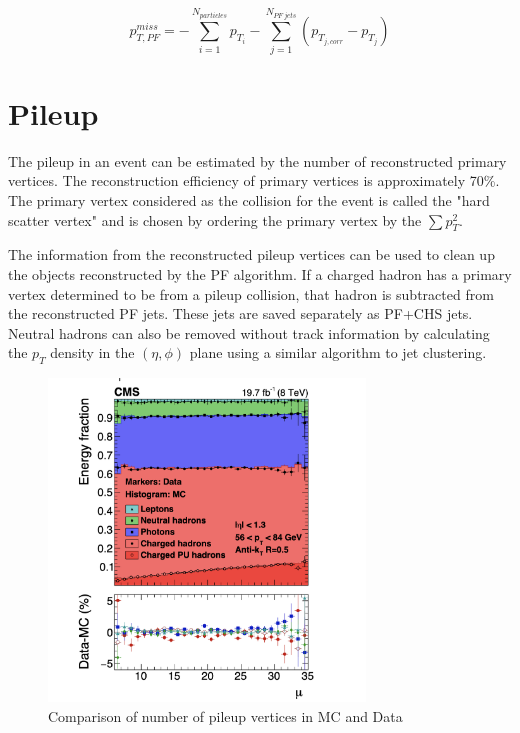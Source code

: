 \begin{equation}
	p^{miss}_{T,PF}   = -\sum_{i=1}^{N_{particles}} p_{T_{i}} - \sum_{j=1}^{N_{PF\ jets}} (p_{T_{j,corr}} - p_{T_{j}})
	\label{eq:ptmiss_corr}
\end{equation}

\section{Pileup}

The pileup in an event can be estimated by the number of reconstructed primary vertices. The reconstruction efficiency of primary vertices is approximately 70\%. The primary vertex considered as the collision for the event is called the "hard scatter vertex" and is chosen by ordering the primary vertex by the $\sum p_{T}^2$.

The information from the reconstructed pileup vertices can be used to clean up the objects reconstructed by the PF algorithm. If a charged hadron has a primary vertex determined to be from a pileup collision, that hadron is subtracted from the reconstructed PF jets. These jets are saved separately as PF+CHS jets. Neutral hadrons can also be removed without track information by calculating the $p_T$ density in the $( \eta, \phi )$ plane using a similar algorithm to jet clustering.
\begin{figure}[h]
\centering
\includegraphics[width=0.75\textwidth]{figures/pfvalidation_mu_replace}
\caption{Comparison of number of pileup vertices in MC and Data~\cite{CMS-PRF-14-001}}
\label{fig:pfval_mu}
\end{figure}


